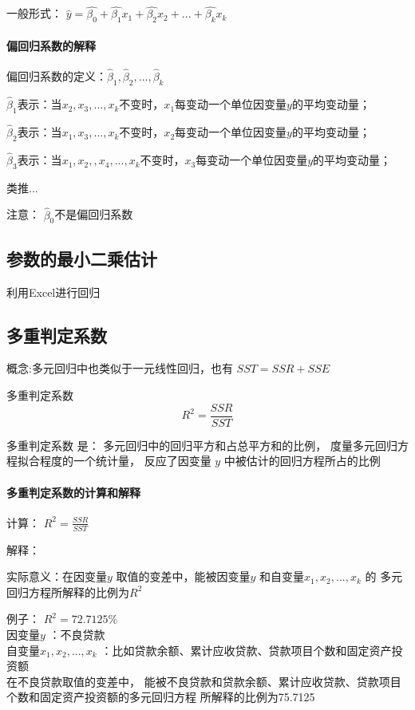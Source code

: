 \documentclass[UTF8,10pt]{book}
\begin{document}
{一般形式：
$\hat{y} = \hat{\beta_0} + \hat{\beta_1} x_1 + \hat{\beta_2} x_2 + ... + \hat{\beta_k} x_k$

\paragraph{偏回归系数的解释} 
偏回归系数的定义：$ \hat{\beta}_1,\hat{\beta}_2,...,\hat{\beta}_k $ 

$\hat{\beta}_1$表示：当$ x_2,x_3,...,x_k$不变时，$x_1$每变动一个单位因变量$y$的平均变动量； 

$\hat{\beta}_2$表示：当$ x_1,x_3,...,x_k$不变时，$x_2$每变动一个单位因变量$y$的平均变动量；

$\hat{\beta}_3$表示：当$ x_1,x_2,,x_4,...,x_k$不变时，$x_3$每变动一个单位因变量$y$的平均变动量； 

类推... 

注意：
$\hat{\beta}_0 $不是偏回归系数


\subsection{参数的最小二乘估计}
	
利用Excel进行回归	

\subsection{多重判定系数}
概念:多元回归中也类似于一元线性回归，也有 $ SST = SSR + SSE $ 

多重判定系数 
$$ R^2 = \frac{SSR}{SST} $$ 

多重判定系数 是： 多元回归中的回归平方和占总平方和的比例，
度量多元回归方程拟合程度的一个统计量，
反应了因变量 $y$ 中被估计的回归方程所占的比例

\paragraph{多重判定系数的计算和解释}

计算： 
$ R^2 = \frac{SSR}{SST} $

解释： 

实际意义：在因变量$y$ 取值的变差中，能被因变量$y$ 和自变量$x_1,x_2,...,x_k$ 的
多元回归方程所解释的比例为$R^2$ 

例子： $R^2=72.7125\% $ \\
因变量$y$ ：不良贷款 \\
自变量$x_1,x_2,...,x_k$ ：比如贷款余额、累计应收贷款、贷款项目个数和固定资产投资额 \\
在不良贷款取值的变差中，
能被不良贷款和贷款余额、累计应收贷款、贷款项目个数和固定资产投资额的多元回归方程
所解释的比例为75.7125%


}
\end{document}

